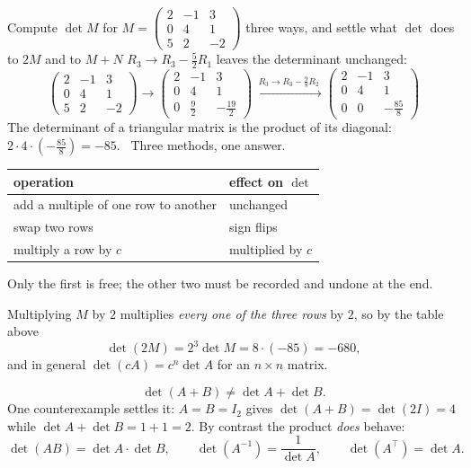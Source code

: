 \begin{worked}{Compute $\det M$ for $M=\begin{pmatrix}2&-1&3\\0&4&1\\5&2&-2\end{pmatrix}$ three ways, and settle what $\det$ does to $2M$ and to $M+N$}
$R_{3}\to R_{3}-\tfrac52R_{1}$ leaves the determinant unchanged:
\[
  \begin{pmatrix}2&-1&3\\0&4&1\\5&2&-2\end{pmatrix}
  \longrightarrow
  \begin{pmatrix}2&-1&3\\0&4&1\\0&\tfrac92&-\tfrac{19}{2}\end{pmatrix}
  \xrightarrow{\;R_{3}\to R_{3}-\tfrac98R_{2}\;}
  \begin{pmatrix}2&-1&3\\0&4&1\\0&0&-\tfrac{85}{8}\end{pmatrix}
\]
The determinant of a triangular matrix is the product of its diagonal:
$2\cdot4\cdot(-\tfrac{85}{8})=-85$. \checkmark\ Three methods, one answer.

\begin{center}\footnotesize
\begin{tabular}{ll}
  \hline
  operation & effect on $\det$\\
  \hline
  add a multiple of one row to another & unchanged\\
  swap two rows & sign flips\\
  multiply a row by $c$ & multiplied by $c$\\
  \hline
\end{tabular}
\end{center}
Only the first is free; the other two must be recorded and undone at the
end.

Multiplying $M$ by $2$ multiplies \emph{every one of the three rows} by $2$,
so by the table above
\[
  \det(2M)=2^{3}\det M=8\cdot(-85)=-680 ,
\]
and in general $\det(cA)=c^{n}\det A$ for an $n\times n$ matrix.

\[
  \det(A+B)\neq\det A+\det B .
\]
One counterexample settles it: $A=B=I_{2}$ gives $\det(A+B)=\det(2I)=4$
while $\det A+\det B=1+1=2$. By contrast the product \emph{does} behave:
\[
  \det(AB)=\det A\cdot\det B,
  \qquad
  \det(A^{-1})=\frac{1}{\det A},
  \qquad
  \det(A^{\!\top})=\det A .
\]


\end{worked}
